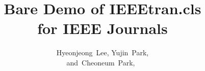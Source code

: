 \documentclass[journal]{IEEEtran}
\begin{document}
%
\title{Bare Demo of IEEEtran.cls\\ for IEEE Journals}
%
%
%

\author{Hyeonjeong~Lee,
        Yujin~Park,
        
        and~Cheoneum~Park,~%
}

% 
%
\end{document}

